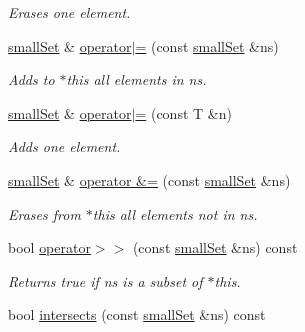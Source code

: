 \begin{CompactItemize}
\begin{CompactList}\small\item\em Erases one element. \item\end{CompactList}\item 
\hypertarget{classdai_1_1smallSet_c2e95c8464389c28d989a7e2013999ed}{
\hyperlink{classdai_1_1smallSet}{smallSet} \& \hyperlink{classdai_1_1smallSet_c2e95c8464389c28d989a7e2013999ed}{operator$|$=} (const \hyperlink{classdai_1_1smallSet}{smallSet} \&ns)}
\label{classdai_1_1smallSet_c2e95c8464389c28d989a7e2013999ed}

\begin{CompactList}\small\item\em Adds to $\ast$this all elements in ns. \item\end{CompactList}\item 
\hypertarget{classdai_1_1smallSet_3ab8465276b9f0533b7f641c87dca9e9}{
\hyperlink{classdai_1_1smallSet}{smallSet} \& \hyperlink{classdai_1_1smallSet_3ab8465276b9f0533b7f641c87dca9e9}{operator$|$=} (const T \&n)}
\label{classdai_1_1smallSet_3ab8465276b9f0533b7f641c87dca9e9}

\begin{CompactList}\small\item\em Adds one element. \item\end{CompactList}\item 
\hypertarget{classdai_1_1smallSet_dfcfeeb334b9f46115185c9320ba655b}{
\hyperlink{classdai_1_1smallSet}{smallSet} \& \hyperlink{classdai_1_1smallSet_dfcfeeb334b9f46115185c9320ba655b}{operator \&=} (const \hyperlink{classdai_1_1smallSet}{smallSet} \&ns)}
\label{classdai_1_1smallSet_dfcfeeb334b9f46115185c9320ba655b}

\begin{CompactList}\small\item\em Erases from $\ast$this all elements not in ns. \item\end{CompactList}\item 
\hypertarget{classdai_1_1smallSet_49518998a31f63cf7a725937da3f2b6e}{
bool \hyperlink{classdai_1_1smallSet_49518998a31f63cf7a725937da3f2b6e}{operator$>$$>$} (const \hyperlink{classdai_1_1smallSet}{smallSet} \&ns) const }
\label{classdai_1_1smallSet_49518998a31f63cf7a725937da3f2b6e}

\begin{CompactList}\small\item\em Returns true if ns is a subset of $\ast$this. \item\end{CompactList}\item 
\hypertarget{classdai_1_1smallSet_c9180f866aa64a6021263a03ec4fab09}{
bool \hyperlink{classdai_1_1smallSet_c9180f866aa64a6021263a03ec4fab09}{intersects} (const \hyperlink{classdai_1_1smallSet}{smallSet} \&ns) const }
\label{classdai_1_1smallSet_c9180f866aa64a6021263a03ec4fab09}


\end{CompactItemize}
